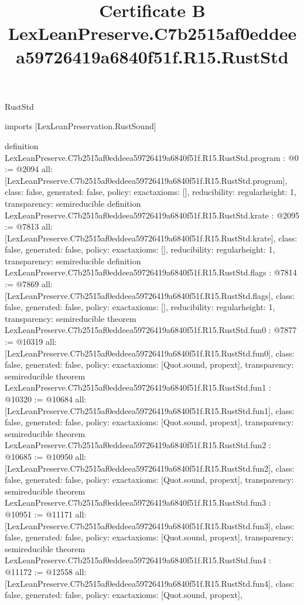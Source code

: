 \begin{lexlean}{RustStd}
\title{Certificate B LexLeanPreserve.C7b2515af0eddeea59726419a6840f51f.R15.RustStd}
\begin{coremodule}
imports [LexLeanPreservation.RustSound]

definition LexLeanPreserve.C7b2515af0eddeea59726419a6840f51f.R15.RustStd.program : @0 := @2094 {
  all: [LexLeanPreserve.C7b2515af0eddeea59726419a6840f51f.R15.RustStd.program],
  class: false,
  generated: false,
  policy: exact{axioms: []},
  reducibility: regular{height: 1},
  transparency: semireducible
}
definition LexLeanPreserve.C7b2515af0eddeea59726419a6840f51f.R15.RustStd.krate : @2095 := @7813 {
  all: [LexLeanPreserve.C7b2515af0eddeea59726419a6840f51f.R15.RustStd.krate],
  class: false,
  generated: false,
  policy: exact{axioms: []},
  reducibility: regular{height: 1},
  transparency: semireducible
}
definition LexLeanPreserve.C7b2515af0eddeea59726419a6840f51f.R15.RustStd.flags : @7814 := @7869 {
  all: [LexLeanPreserve.C7b2515af0eddeea59726419a6840f51f.R15.RustStd.flags],
  class: false,
  generated: false,
  policy: exact{axioms: []},
  reducibility: regular{height: 1},
  transparency: semireducible
}
theorem LexLeanPreserve.C7b2515af0eddeea59726419a6840f51f.R15.RustStd.fun0 : @7877 := @10319 {
  all: [LexLeanPreserve.C7b2515af0eddeea59726419a6840f51f.R15.RustStd.fun0],
  class: false,
  generated: false,
  policy: exact{axioms: [Quot.sound, propext]},
  transparency: semireducible
}
theorem LexLeanPreserve.C7b2515af0eddeea59726419a6840f51f.R15.RustStd.fun1 : @10320 := @10684 {
  all: [LexLeanPreserve.C7b2515af0eddeea59726419a6840f51f.R15.RustStd.fun1],
  class: false,
  generated: false,
  policy: exact{axioms: [Quot.sound, propext]},
  transparency: semireducible
}
theorem LexLeanPreserve.C7b2515af0eddeea59726419a6840f51f.R15.RustStd.fun2 : @10685 := @10950 {
  all: [LexLeanPreserve.C7b2515af0eddeea59726419a6840f51f.R15.RustStd.fun2],
  class: false,
  generated: false,
  policy: exact{axioms: [Quot.sound, propext]},
  transparency: semireducible
}
theorem LexLeanPreserve.C7b2515af0eddeea59726419a6840f51f.R15.RustStd.fun3 : @10951 := @11171 {
  all: [LexLeanPreserve.C7b2515af0eddeea59726419a6840f51f.R15.RustStd.fun3],
  class: false,
  generated: false,
  policy: exact{axioms: [Quot.sound, propext]},
  transparency: semireducible
}
theorem LexLeanPreserve.C7b2515af0eddeea59726419a6840f51f.R15.RustStd.fun4 : @11172 := @12558 {
  all: [LexLeanPreserve.C7b2515af0eddeea59726419a6840f51f.R15.RustStd.fun4],
  class: false,
  generated: false,
  policy: exact{axioms: [Quot.sound, propext]},
}
\end{coremodule}
\end{lexlean}
